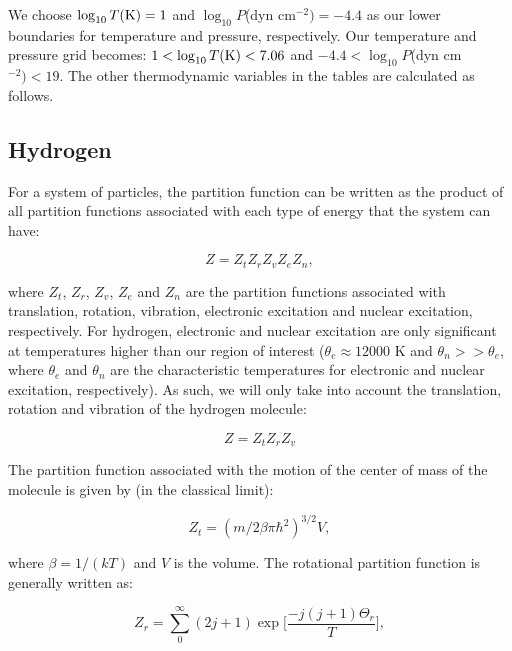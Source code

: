 \documentclass[apj]{emulateapj}
\begin{document}
We choose $\log_{10} T (\rm{K})=1$ and $ \log_{10}P$(dyn cm$^{-2})=-4.4$ as our lower boundaries for temperature and pressure, respectively. Our temperature and pressure grid becomes: $1 < \log_{10} T(\rm{K})<7.06$ and $-4.4<\log_{10}P$(dyn cm$^{-2})<19$. The other thermodynamic variables in the tables are calculated as follows.

\subsection{Hydrogen}

\label{hydrogen}

For a system of particles, the partition function can be written as the product of all partition functions associated with each type of energy that the system can have:

\begin{equation}
\label{eq:z}
Z=Z_t Z_r Z_v Z_e Z_n,
\end{equation}

\noindent where $Z_t$, $Z_r$, $Z_v$, $Z_e$ and $Z_n$ are the partition functions associated with translation, rotation, vibration, electronic excitation and nuclear excitation, respectively. For hydrogen, electronic and nuclear excitation are only significant at temperatures higher than our region of interest ($\theta_e \approx 12000$ K and $\theta_n >> \theta_e$, where $\theta_e$ and $\theta_n$ are the characteristic temperatures for electronic and nuclear excitation, respectively). As such, we will only take into account the translation, rotation and vibration of the hydrogen molecule:

\begin{equation}
\label{eq:zagain}
Z=Z_t Z_r Z_v
\end{equation} 

The partition function associated with the motion of the center of mass of the molecule is given by (in the classical limit):

\begin{equation}
\label{eq:Zt}
Z_t=(m/2 \beta \pi \hbar^2)^{3/2} V,
\end{equation}

\noindent where $\beta=1/(k T)$ and $V$ is the volume. The rotational partition function is generally written as:

\begin{equation}
\label{eq:Zr}
Z_r=\sum_0^\infty (2 j+1) \exp{\Big[\frac{-j (j+1)\Theta_r}{T}\Big]},
\end{equation}
\end{document}
